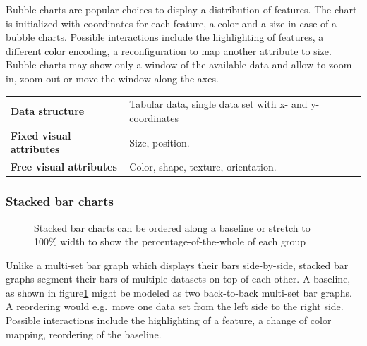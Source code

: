 \documentclass{article}
\newcommand{\conceptTable}[3]{%
    \begin{center}
    {\small
        \begin{tabulary}{\textwidth}{ll}
            \bf Data structure & #1 \\

            \bf Fixed visual attributes & #2 \\

            \bf Free visual attributes & #3  \\
        \end{tabulary}
    }
    \end{center}
}
\begin{document}
Bubble charts are popular choices to display a distribution of features.
The chart is initialized with coordinates for each feature, a color and a size in case of a bubble charts. 
Possible interactions include the highlighting of features, a different color encoding, a reconfiguration to map another attribute to size.
Bubble charts may show only a window of the available data and allow to zoom in, zoom out or move the window along the axes.

\conceptTable{Tabular data, single data set with x- and y-coordinates}{Size, position.}{Color, shape, texture, orientation.}

\subsubsection{Stacked bar charts}

\begin{figure}
  \centering
    \qquad
    \caption{Stacked bar charts can be ordered along a baseline or stretch to 100\% width to show the percentage-of-the-whole of each group}%
    \label{fig:concept:chart-types:stacked-bar-chart}
\end{figure}

Unlike a multi-set bar graph which displays their bars side-by-side, stacked bar graphs segment their bars of multiple datasets on top of each other.
A baseline, as shown in figure\ref{fig:concept:chart-types:stacked-bar-chart} might be modeled as two back-to-back multi-set bar graphs. A reordering would e.g.\ move one data set from the left side to the right side.
Possible interactions include the highlighting of a feature, a change of color mapping, reordering of the baseline.
\end{document}
